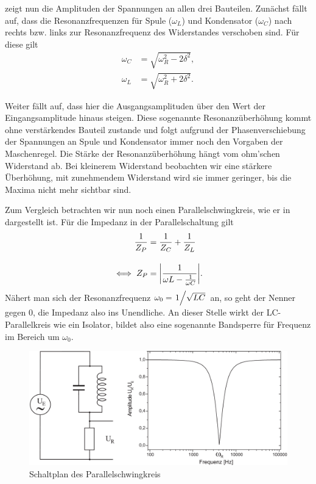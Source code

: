  zeigt nun die Amplituden der Spannungen an allen drei Bauteilen. Zunächst fällt auf, dass die Resonanzfrequenzen für Spule ($\omega_L$) und Kondensator ($\omega_C$) nach rechts bzw. links zur Resonanzfrequenz des Widerstandes verschoben sind. Für diese gilt
\begin{align}
  \omega_C &= \sqrt{\omega_R^2 - 2\delta^2},\\
  \omega_L &= \sqrt{\omega_R^2 + 2\delta^2}.
\end{align}

Weiter fällt auf, dass hier die Ausgangsamplituden über den Wert der Eingangsamplitude hinaus steigen. Diese sogenannte Resonanzüberhöhung kommt ohne verstärkendes Bauteil zustande und folgt aufgrund der Phasenverschiebung der Spannungen an Spule und Kondensator immer noch den Vorgaben der Maschenregel. Die Stärke der Resonanzüberhöhung hängt vom ohm'schen Widerstand ab. Bei kleinerem Widerstand beobachten wir eine stärkere Überhöhung, mit zunehmendem Widerstand wird sie immer geringer, bis die Maxima nicht mehr sichtbar sind.

Zum Vergleich betrachten wir nun noch einen Parallelschwingkreis, wie er in  dargestellt ist. Für die Impedanz in der Parallelschaltung gilt
\begin{align}
  \frac{1}{Z_P} &= \frac{1}{Z_C} + \frac{1}{Z_L}\\[1em]
  \iff Z_P &= \qty|\frac{1}{\omega L - \frac{1}{\omega C}}|.
\end{align}
Nähert man sich der Resonanzfrequenz $\omega_0 = \ffrac{1}{\sqrt{LC}}$ an, so geht der Nenner gegen 0, die Impedanz also ins Unendliche. An dieser Stelle wirkt der LC-Parallelkreis wie ein Isolator, bildet also eine sogenannte Bandsperre für Frequenz im Bereich um $\omega_0$.

\begin{figure}[H]
  \centering
  \includegraphics[width=.70\textwidth]{files/script/parallelschwingkreis.png}
  \caption{Schaltplan des Parallelschwingkreis}
  \label{fig:parallelschwingkreis}
\end{figure}

